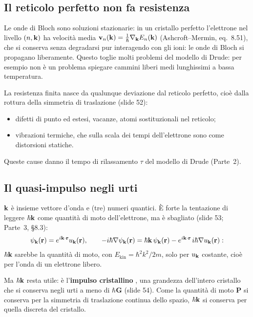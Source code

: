 \documentclass[11pt,a4paper]{article}
\begin{document}
\subsection{Il reticolo perfetto non fa resistenza}
\begin{risultato}
Le onde di Bloch sono soluzioni stazionarie: in un cristallo perfetto l'elettrone nel livello $(n,\mathbf k)$ ha velocità media
$\mathbf v_n(\mathbf k)=\frac1\hbar\nabla_{\mathbf k}E_n(\mathbf k)$ (Ashcroft--Mermin, eq.~8.51), che si conserva senza degradarsi pur interagendo con gli ioni: le onde
di Bloch si propagano liberamente. Questo toglie molti problemi del modello di Drude: per esempio non è un problema spiegare cammini liberi medi
 lunghissimi a bassa temperatura.
\end{risultato}
La resistenza finita nasce da qualunque deviazione dal reticolo perfetto, cioè dalla rottura della simmetria di traslazione (slide 52):
\begin{itemize}[leftmargin=*]
\item difetti di punto ed estesi, vacanze, atomi sostituzionali nel reticolo;
\item vibrazioni termiche, che sulla scala dei tempi dell'elettrone sono come distorsioni statiche.
\end{itemize}
Queste cause danno il tempo di rilassamento $\tau$  del modello di Drude (Parte~2).

\subsection{Il quasi-impulso negli urti}
$\mathbf k$ è insieme vettore d'onda e (tre) numeri quantici. È forte la tentazione di leggere $\hbar\mathbf k$ come quantità di moto dell'elettrone, ma è sbagliato
(slide 53; Parte~3, §8.3):
\[
\psi_{\mathbf k}(\mathbf r)=e^{i\mathbf k\cdot\mathbf r}u_{\mathbf k}(\mathbf r),\qquad -i\hbar\nabla\psi_{\mathbf k}(\mathbf r)=\hbar\mathbf k\,\psi_{\mathbf k}(\mathbf r)-e^{i\mathbf k\cdot\mathbf r}\,i\hbar\nabla u_{\mathbf k}(\mathbf r):
\]
$\hbar\mathbf k$ sarebbe la quantità di moto, con $E_{\mathrm{kin}}=\hbar^2k^2/2m$, solo per $u_{\mathbf k}$ costante, cioè per l'onda di un elettrone libero.

Ma $\hbar\mathbf k$ resta utile: è l'\textbf{impulso cristallino} , una grandezza dell'intero cristallo che si conserva negli urti a
meno di $\hbar\mathbf G$ (slide 54). Come la quantità di moto $\mathbf P$ si conserva per la simmetria di traslazione continua dello spazio, $\hbar\mathbf k$
si conserva per quella discreta del cristallo.
\end{document}
